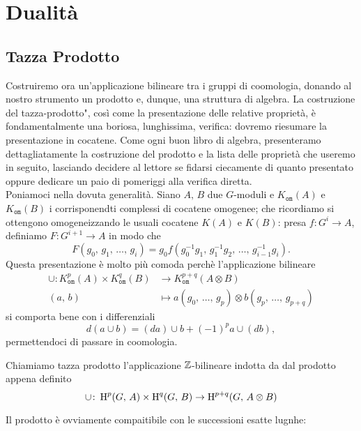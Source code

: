 \chapter{Dualità}

\section{Tazza Prodotto}
Costruiremo ora un'applicazione bilineare tra i gruppi di coomologia, donando al nostro strumento un prodotto e, dunque, una struttura di algebra. La costruzione del \leftquote tazza-prodotto", così come la presentazione delle relative proprietà, è fondamentalmente una boriosa, lunghissima, verifica: dovremo riesumare la presentazione in cocatene. Come ogni buon libro di algebra, presenteramo dettagliatamente la costruzione del prodotto e la lista delle proprietà che useremo in seguito, lasciando decidere al lettore se fidarsi ciecamente di quanto presentato oppure dedicare un paio di pomeriggi alla verifica diretta. \\

Poniamoci nella dovuta generalità. Siano $ A, \, B $ due $ G $-moduli e $ K_{\mathtt{om}}(A) $ e $ K_{\mathtt{om}}(B) $ i corrisponendti complessi di cocatene omogenee; che ricordiamo si ottengono omogeneizzando le usuali cocatene $ K(A) $ e $ K(B) $: presa $ f \colon G^i \to A $, definiamo $ F\colon G^{i+1} \to A  $ in modo che
\[ F(g_0, \, g_1, \, \dots, \, g_i) = g_0 f(g_0^{-1}g_1, \, g_1^{-1}g_2, \, \dots, \, g_{i-1}^{-1}g_i). \]
Questa presentazione è molto più comoda perchè l'applicazione bilineare
\begin{align*}
	\cup \colon K^p_{\mathtt{om}}(A) \times K^q_{\mathtt{om}}(B) &\to K_{\mathtt{om}}^{p+q}(A \otimes B)\\
	(a, \, b) & \mapsto a(g_0,\, \dots, \, g_p) \otimes b(g_p,\, \dots, \, g_{p+q})
\end{align*}
si comporta bene con i differenziali
\[ d(a \cup b) = (da) \cup b + (-1)^p a \cup (db), \]
permettendoci di passare in coomologia.

\begin{definition}
	Chiamiamo tazza prodotto l'applicazione $ \mathbb{Z} $-bilineare indotta da dal prodotto appena definito
	\[ \cup \colon \operatorname{H}^p(G, \, A) \times \operatorname{H}^q(G, \, B) \to \operatorname{H}^{p+q}(G, \, A \otimes B)  \]
\end{definition}

Il prodotto è ovviamente compaitibile con le successioni esatte lugnhe:

